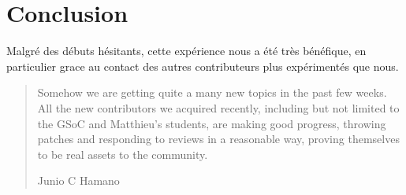 \documentclass[a4paper, 12pt]{article}
\begin{document}
\section{Conclusion}

Malgré des débuts hésitants, cette expérience nous a été très bénéfique, en particulier grace au contact des autres contributeurs plus expérimentés que nous.


\begin{quote} 
   Somehow we are getting quite a many new topics in the past few
weeks.  All the new contributors we acquired recently, including but not limited to the GSoC and Matthieu's students, are making good progress, throwing patches and responding to reviews in a reasonable way, proving themselves to be real assets to the community.
   \begin{flushright}
      Junio C Hamano
   \end{flushright}
\end{quote}
\end{document}
